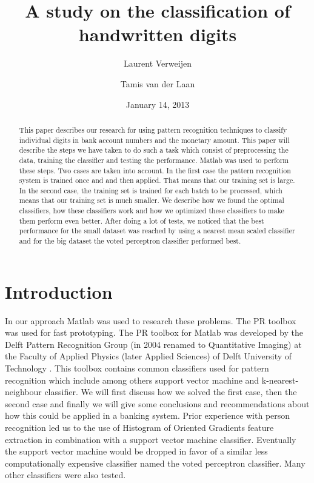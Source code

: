 \documentclass[%
        compressed,
        final,
        notitlepage,
        narroweqnarray,
        inline,
        twoside,
        ]{ieee}
\title{A study on the classification of handwritten digits}
\author{Laurent Verweijen \and Tamis van der Laan}
\date{January 14, 2013}
\begin{document}
\maketitle

\begin{abstract}
This paper describes our research for using pattern recognition techniques to classify individual digits in bank account numbers and the monetary amount. This paper will describe the steps we have taken to do such a task which consist of preprocessing the data, training the classifier and testing the performance. Matlab was used to perform these steps. Two cases are taken into account. In the first case the pattern recognition system is trained once and and then applied. That means that our training set is large. In the second case, the training set is trained for each batch to be processed, which means that our training set is much smaller. We describe how we found the optimal classifiers, how these classifiers work and how we optimized these classifiers to make them perform even better. After doing a lot of tests, we noticed that the best performance for the small dataset was reached by using a nearest mean scaled classifier and for the big dataset the voted perceptron classifier performed best. 
\end{abstract}

\section{Introduction}

In our approach Matlab was used to research these problems. The PR toolbox was
used for fast prototyping. The PR toolbox for Matlab was developed by the Delft
Pattern Recognition Group (in 2004 renamed to Quantitative Imaging) at the
Faculty of Applied Physics (later Applied Sciences) of Delft University of
Technology \cite{Ferdi}.
This toolbox contains common classifiers used for pattern recognition which
include among others support vector machine and k-nearest-neighbour classifier. We will first
discuss how we solved the first case, then the second case and finally we will
give some conclusions and recommendations about how this could be applied in a
banking system. Prior experience with person recognition \cite{Tamis} led us to
the use of Histogram of Oriented Gradients feature
extraction in combination with a support vector machine classifier. Eventually
the support vector machine would be dropped in favor of a similar less
computationally expensive classifier named the voted perceptron classifier. Many
other classifiers were also tested.
\end{document}
